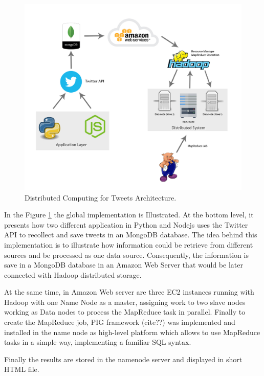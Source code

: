 \documentclass{article}
\newcommand*\setcaptioncitation[1]{\def\captioncitation{\textit{Source:}~#1}}
\let\captioncitation\relax
\begin{document}
        \begin{figure}[H]
            \centering 
            \includegraphics[width=1\linewidth]{./img/architecture.jpg}
            \setcaptioncitation{Self-made.}
            \caption{Distributed Computing for Tweets Architecture.}
            \label{fig:architecture}
        \end{figure}

        In the Figure \ref{fig:architecture} the global implementation is Illustrated. At the bottom level, it presents how two different application in Python and Nodejs uses the Twitter API to recollect and save tweets
        in an MongoDB database. The idea behind this implementation is to illustrate how information could be retrieve from different sources and be processed as one data source.
        Consequently, the information is save in a MongoDB database in an Amazon Web Server that would be later connected with Hadoop distributed storage.

        At the same time, in Amazon Web server are three EC2 instances running with Hadoop with one Name Node as a master, assigning work to two slave nodes working as Data nodes to process the MapReduce task in
        parallel. Finally to create the MapReduce job, PIG framework (cite??) was implemented and installed in the name node as high-level platform which allows to use MapReduce tasks in a simple way, implementing
        a familiar SQL syntax.

        Finally the results are stored in the namenode server and displayed in short HTML file.
\end{document}
